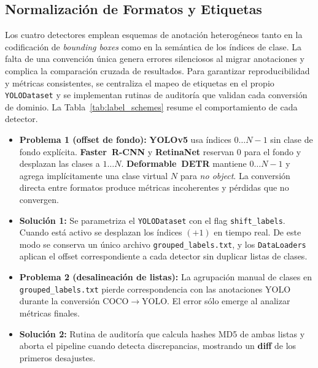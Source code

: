 \subsection{Normalización de Formatos y Etiquetas}\label{ssec:label_norm}

Los cuatro detectores emplean esquemas de anotación heterogéneos tanto en la codificación de \emph{bounding boxes} como en la semántica de los índices de clase.
La falta de una convención única genera errores silenciosos al migrar anotaciones y complica la comparación cruzada de resultados.
Para garantizar reproducibilidad y métricas consistentes, se centraliza el mapeo de etiquetas en el propio \texttt{YOLODataset} y se implementan rutinas de auditoría que validan cada conversión de dominio.
La Tabla~\ref{tab:label_schemes} resume el comportamiento de cada detector.

\begin{itemize}
   \item \textbf{Problema 1 (offset de fondo):}
         \textbf{YOLOv5} usa índices \(0\dots N{-}1\) sin clase de fondo explícita.
         \textbf{Faster~R-CNN} y \textbf{RetinaNet} reservan \(0\) para el fondo y desplazan las clases a \(1\dots N\).
         \textbf{Deformable~DETR} mantiene \(0\dots N{-}1\) y agrega implícitamente una clase virtual \(N\) para \textit{no object}.
         La conversión directa entre formatos produce métricas incoherentes y pérdidas que no convergen.
   \item \textbf{Solución 1:}
   Se parametriza el \texttt{YOLODataset} con el flag \texttt{shift\_labels}.
   Cuando está activo se desplazan los índices \((+1)\) en tiempo real.
   De este modo se conserva un único archivo \texttt{grouped\_labels.txt}, y los \texttt{DataLoaders} aplican el offset correspondiente a cada detector sin duplicar listas de clases.
   \item \textbf{Problema 2 (desalineación de listas):}
   La agrupación manual de clases en \texttt{grouped\_labels.txt} pierde correspondencia con las anotaciones YOLO durante la conversión COCO\(\rightarrow\)YOLO.
   El error sólo emerge al analizar métricas finales.
   \item \textbf{Solución 2:}
   Rutina de auditoría que calcula hashes MD5 de ambas listas y aborta el pipeline cuando detecta discrepancias, mostrando un \textbf{diff} de los primeros desajustes.
\end{itemize}


